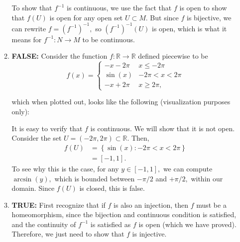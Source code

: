\documentclass{article}
\numberwithin{equation}{section}
\begin{document}
\begin{enumerate}
\begin{enumerate}[label=(\alph*)]
        To show that $f^{-1}$ is continuous, we use the fact that $f$ is open to show that $f(U)$ is open for any open set $U\subset M.$ But since $f$ is bijective, we can rewrite $f = (f^{-1})^{-1},$ so $\left(f^{-1}\right)^{-1}(U)$ is open, which is what it means for $f^{-1}:N\to M$ to be continuous.
        \item \textbf{FALSE:} Consider the function $f:\mathbb{R}\to\mathbb{R}$ defined piecewise to be 
        \begin{equation*}
         f(x) = \begin{cases}
            -x-2\pi & x \le -2\pi \\ 
            \sin(x) & -2\pi < x < 2\pi \\ 
            -x+2\pi & x \ge 2\pi,
         \end{cases}   
        \end{equation*} 

         which when plotted out, looks like the following (visualization purposes only):
         \begin{center}
         \end{center}
         It is easy to verify that $f$ is continuous. We will show that it is not open. Consider the set $U=(-2\pi,2\pi) \subset \mathbb{R}.$ Then,
         \begin{align*}
            f(U) &= \left\{\sin(x): -2\pi < x < 2\pi \right\} \\ 
            &= [-1,1].
         \end{align*} 
         To see why this is the case, for any $y\in [-1,1],$ we can compute $\arcsin(y),$ which is bounded between $-\pi/2$ and $+\pi/2,$ within our domain. Since $f(U)$ is closed, this is false.
         \item \textbf{TRUE:} First recognize that if $f$ is also an injection, then $f$ must be a homeomorphism, since the bijection and continuous condition is satisfied, and the continuity of $f^{-1}$ is satisfied as $f$ is open (which we have proved). Therefore, we just need to show that $f$ is injective.
         

\end{enumerate}
\end{enumerate}
\end{document}
